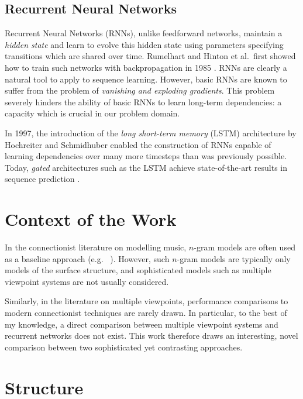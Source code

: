 \documentclass[12pt,a4paper,twoside,openright]{report}
\begin{document}
\subsection{Recurrent Neural Networks}

Recurrent Neural Networks (RNNs), unlike feedforward networks, maintain a
\emph{hidden state} and learn to evolve this hidden state using parameters
specifying transitions which are shared over time. Rumelhart and Hinton et al.\
first showed how to train such networks with backpropagation in 1985
\cite{rumelhart1985learning}. RNNs are clearly a natural tool to apply to
sequence learning. However, basic RNNs are known to suffer from the problem of
\emph{vanishing and exploding gradients}. This problem severely hinders the
ability of basic RNNs to learn long-term dependencies: a capacity which is
crucial in our problem domain.

In 1997, the introduction of the \emph{long short-term memory} (LSTM)
architecture by Hochreiter and Schmidhuber \cite{hochreiter1997long} enabled the
construction of RNNs capable of learning dependencies over many more timesteps
than was previously possible. Today, \emph{gated} architectures such as the LSTM
achieve state-of-the-art results in sequence prediction \cite{zaremba2014recurrent}.

\section{Context of the Work}\label{sec:context-of-work}

In the connectionist literature on modelling music, $n$-gram models are often
used as a baseline approach (e.g.\ \cite{boulanger2012modeling}
\cite{liangbachbot}). However, such $n$-gram models are typically only
models of the surface structure, and sophisticated models such as multiple
viewpoint systems are not usually considered.

Similarly, in the literature on multiple viewpoints, performance comparisons to
modern connectionist techniques are rarely drawn. In particular, to the best of
my knowledge, a direct comparison between multiple viewpoint systems and
recurrent networks does not exist. This work therefore draws an interesting, 
novel comparison between two sophisticated yet contrasting approaches.

\section{Structure}
\end{document}
